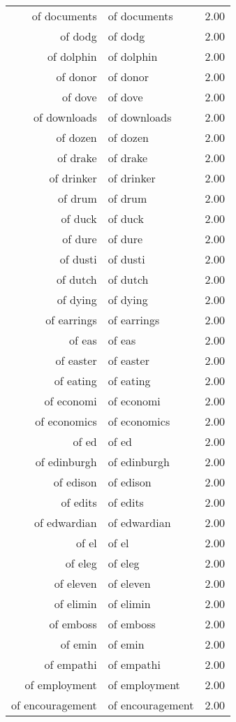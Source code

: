 \begin{table}[ht]
\begin{tabular}{rlr}
  of documents & of documents & 2.00 \\ 
  of dodg & of dodg & 2.00 \\ 
  of dolphin & of dolphin & 2.00 \\ 
  of donor & of donor & 2.00 \\ 
  of dove & of dove & 2.00 \\ 
  of downloads & of downloads & 2.00 \\ 
  of dozen & of dozen & 2.00 \\ 
  of drake & of drake & 2.00 \\ 
  of drinker & of drinker & 2.00 \\ 
  of drum & of drum & 2.00 \\ 
  of duck & of duck & 2.00 \\ 
  of dure & of dure & 2.00 \\ 
  of dusti & of dusti & 2.00 \\ 
  of dutch & of dutch & 2.00 \\ 
  of dying & of dying & 2.00 \\ 
  of earrings & of earrings & 2.00 \\ 
  of eas & of eas & 2.00 \\ 
  of easter & of easter & 2.00 \\ 
  of eating & of eating & 2.00 \\ 
  of economi & of economi & 2.00 \\ 
  of economics & of economics & 2.00 \\ 
  of ed & of ed & 2.00 \\ 
  of edinburgh & of edinburgh & 2.00 \\ 
  of edison & of edison & 2.00 \\ 
  of edits & of edits & 2.00 \\ 
  of edwardian & of edwardian & 2.00 \\ 
  of el & of el & 2.00 \\ 
  of eleg & of eleg & 2.00 \\ 
  of eleven & of eleven & 2.00 \\ 
  of elimin & of elimin & 2.00 \\ 
  of emboss & of emboss & 2.00 \\ 
  of emin & of emin & 2.00 \\ 
  of empathi & of empathi & 2.00 \\ 
  of employment & of employment & 2.00 \\ 
  of encouragement & of encouragement & 2.00 \\ 

\end{tabular}
\end{table}

